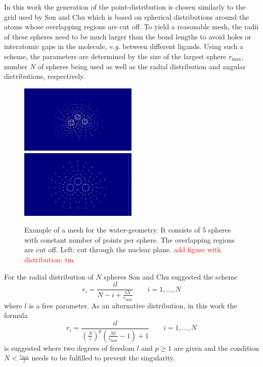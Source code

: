 In this work the generation of the point-distribution is chosen similarly to the grid used by Son and Chu \cite{Son_Chu} which is based on spherical distributions around the atoms whose overlapping regions are cut off.
To yield a reasonable mesh, the radii of these spheres need to be much larger than the bond lengths to avoid holes or interatomic gaps in the molecule, \textit{e.g.} between different ligands.
Using such a scheme, the parameters are determined by the size of the largest sphere $r_\text{max}$, number $N$ of spheres being used as well as the radial distribution and angular distributions, respectively.
\begin{figure}
   \includegraphics[width=0.5\textwidth]{water1}
   \includegraphics[width=0.5\textwidth]{water2}
   \caption{Example of a mesh for the water-geometry. It consists of $5$ spheres with constant number of points per sphere. The overlapping regions are cut off. Left: cut through the nuclear plane. 
   \textcolor{red}{add figure with distribution: tm}}
   \label{fig:molmesh}
\end{figure}

For the radial distribution of $N$ spheres Son and Chu \cite{Son_Chu0} suggested the scheme
\begin{equation}
r_i=\frac{il}{N-i+\frac{lN}{r_\text{max}}} \qquad i=1,\hdots ,N 
\end{equation}
where $l$ is a free parameter.
As an alternative distribution, in this work the formula
\begin{equation}
r_i=\frac{il}{\left( \frac Ni \right)^p \left(\frac{Nl}{r_\text{max}}-1\right) +1} \qquad i=1,\hdots ,N 
\end{equation}
is suggested where two degrees of freedom $l$ and $p\geq 1$ are given and the condition $N<\frac{r_\text{max}}{l}$ needs to be fulfilled to prevent the singularity.

